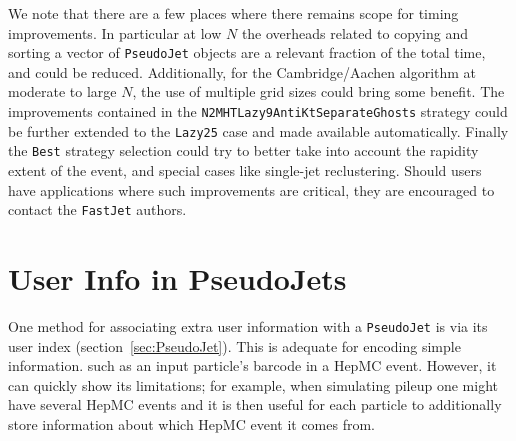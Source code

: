 \documentclass[12pt,a4]{article}
\newcommand{\fastjet}{\texttt{FastJet}\xspace}
\newcommand{\ttt}[1]{{\small\texttt{#1}}}
\newcommand{\order}[1]{{\cal O}\left(#1\right)}
\begin{document}
We note that there are a few places where there remains scope for
timing improvements. 
%
In particular at low $N$ the overheads related to copying and sorting
a vector of \ttt{PseudoJet} objects are a relevant fraction of the
total time, and could be reduced.
%
Additionally, for the Cambridge/Aachen algorithm at moderate to large
$N$, the use of multiple grid sizes could bring some 
benefit.
%
The improvements contained in the \ttt{N2MHTLazy9AntiKtSeparateGhosts}
strategy could be further extended to the \ttt{Lazy25} case and made
available automatically.
%
Finally the \ttt{Best} strategy selection could try to better take
into account the rapidity extent of the event, and special cases like
single-jet reclustering.
% 
%
Should users have applications where such improvements are
critical, they are encouraged to contact the \fastjet authors.

\section{User Info in PseudoJets}
\label{app:user-info}

One method for associating extra user information with a
\ttt{PseudoJet} is via its user index
(section~\ref{sec:PseudoJet}). This is adequate for encoding simple
information. such as an input particle's barcode in a HepMC
event.
%
However, it can quickly show its limitations; for example, when
simulating pileup one might have several HepMC events and it is then
useful for each particle to additionally store information about which
HepMC event it comes from.
\end{document}
